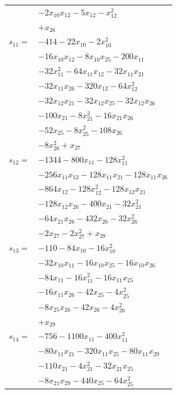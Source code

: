 \begin{longtable}{@{}r@{\;}l@{}}
 & \(\displaystyle -2x_{10}x_{12} -5x_{12} -x_{12}^{2}\) \\
 & \(\displaystyle +x_{26}\) \\[3pt]
\(s_{11}=\) & \(\displaystyle -414 -22x_{10} -2x_{10}^{2}\) \\
 & \(\displaystyle -16x_{10}x_{12} -8x_{10}x_{25} -200x_{11}\) \\
 & \(\displaystyle -32x_{11}^{2} -64x_{11}x_{12} -32x_{11}x_{21}\) \\
 & \(\displaystyle -32x_{11}x_{26} -320x_{12} -64x_{12}^{2}\) \\
 & \(\displaystyle -32x_{12}x_{21} -32x_{12}x_{25} -32x_{12}x_{26}\) \\
 & \(\displaystyle -100x_{21} -8x_{21}^{2} -16x_{21}x_{26}\) \\
 & \(\displaystyle -52x_{25} -8x_{25}^{2} -108x_{26}\) \\
 & \(\displaystyle -8x_{26}^{2} +x_{27}\) \\[3pt]
\(s_{12}=\) & \(\displaystyle -1344 -800x_{11} -128x_{11}^{2}\) \\
 & \(\displaystyle -256x_{11}x_{12} -128x_{11}x_{21} -128x_{11}x_{26}\) \\
 & \(\displaystyle -864x_{12} -128x_{12}^{2} -128x_{12}x_{21}\) \\
 & \(\displaystyle -128x_{12}x_{26} -400x_{21} -32x_{21}^{2}\) \\
 & \(\displaystyle -64x_{21}x_{26} -432x_{26} -32x_{26}^{2}\) \\
 & \(\displaystyle -2x_{27} -2x_{27}^{2} +x_{28}\) \\[3pt]
\(s_{13}=\) & \(\displaystyle -110 -84x_{10} -16x_{10}^{2}\) \\
 & \(\displaystyle -32x_{10}x_{11} -16x_{10}x_{25} -16x_{10}x_{26}\) \\
 & \(\displaystyle -84x_{11} -16x_{11}^{2} -16x_{11}x_{25}\) \\
 & \(\displaystyle -16x_{11}x_{26} -42x_{25} -4x_{25}^{2}\) \\
 & \(\displaystyle -8x_{25}x_{26} -42x_{26} -4x_{26}^{2}\) \\
 & \(\displaystyle +x_{29}\) \\[3pt]
\(s_{14}=\) & \(\displaystyle -756 -1100x_{11} -400x_{11}^{2}\) \\
 & \(\displaystyle -80x_{11}x_{21} -320x_{11}x_{25} -80x_{11}x_{29}\) \\
 & \(\displaystyle -110x_{21} -4x_{21}^{2} -32x_{21}x_{25}\) \\
 & \(\displaystyle -8x_{21}x_{29} -440x_{25} -64x_{25}^{2}\) \\

\end{longtable}
